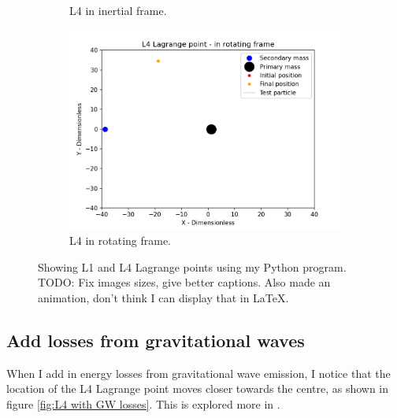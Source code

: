 \documentclass{article}
\begin{document}
\begin{figure}
\begin{subfigure}[b]{0.3\textwidth}
         \caption{L4 in inertial frame.}
         \label{fig:L4 in inertial frame}
     \end{subfigure}
     \begin{subfigure}[b]{0.3\textwidth}
         \centering
         \includegraphics[width=\textwidth]{images/L4 Lagrange point in rotating frame.png}
         \caption{L4 in rotating frame.}
         \label{fig:L4 in rotating frame}
     \end{subfigure}
    \caption{Showing L1 and L4 Lagrange points using my Python program. TODO: Fix images sizes, give better captions. Also made an animation, don't think I can display that in LaTeX.}
    \label{fig:Lagrange points in Python}
\end{figure}



\subsection{Add losses from gravitational waves}
When I add in energy losses from gravitational wave emission, I notice that the location of the  L4 Lagrange point moves closer towards the centre, as shown in figure \ref{fig:L4 with GW losses}. This is explored more in \cite{2010ApJ...724...39S}.
\end{document}
